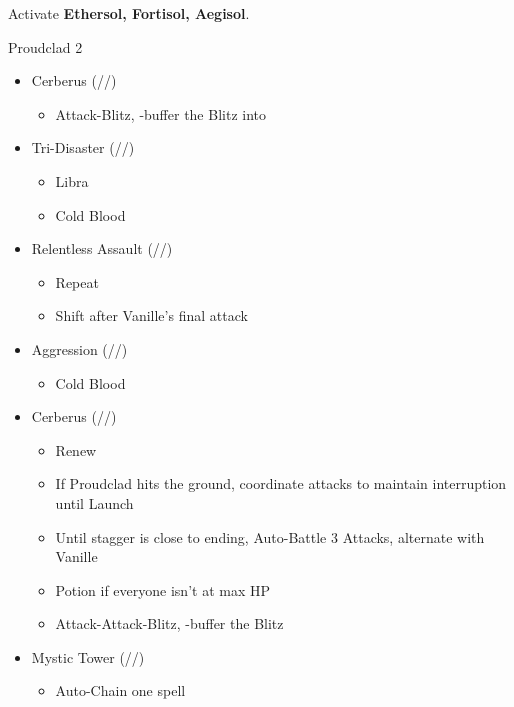 \begin{multicols}{2}
Activate \textbf{Ethersol, Fortisol, Aegisol}.
\renewcommand{\first}{[1] Aggression (\rav/\com/\com)}
\renewcommand{\second}{[2] Cerberus (\com/\com/\com)}
\renewcommand{\third}{[3] Mystic Tower (\rav/\sen/\rav)}
\renewcommand{\fourth}{[4] Solidarity (\com/\sen/\med)}
\renewcommand{\fifth}{[5] Relentless Assault (\rav/\com/\rav)}
\renewcommand{\sixth}{[6] Tri-Disaster (\rav/\rav/\rav)}
\begin{battle}[2:01]{Proudclad 2}
		\begin{itemize}
			\item \second
			      \begin{itemize}
				      \item Attack-Blitz, \rav-buffer the Blitz into
			      \end{itemize}
			\item \sixth
			      \begin{itemize}
				      \item Libra
				      \item Cold Blood
			      \end{itemize}
			\item \fifth
			      \begin{itemize}
				      \item Repeat
				      \item Shift after Vanille's final attack
			      \end{itemize}
			\item \first
			      \begin{itemize}
				      \item Cold Blood
			      \end{itemize}
			\item \second
			      \begin{itemize}
				      \item Renew
				      \item If Proudclad hits the ground, coordinate attacks to maintain interruption until Launch
				      \item Until stagger is close to ending, Auto-Battle 3 Attacks, alternate with Vanille
				      \item Potion if everyone isn't at max HP
				      \item Attack-Attack-Blitz, \rav-buffer the Blitz
			      \end{itemize}
			\item \third
			      \begin{itemize}
				      \item Auto-Chain one spell

\end{itemize}
\end{itemize}
\end{battle}
\end{multicols}

